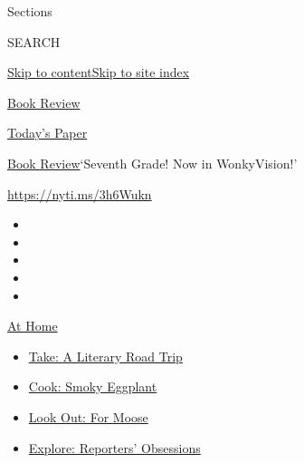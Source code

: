 Sections

SEARCH

\protect\hyperlink{site-content}{Skip to
content}\protect\hyperlink{site-index}{Skip to site index}

\href{https://www.nytimes3xbfgragh.onion/section/books/review}{Book
Review}

\href{https://myaccount.nytimes3xbfgragh.onion/auth/login?response_type=cookie\&client_id=vi}{}

\href{https://www.nytimes3xbfgragh.onion/section/todayspaper}{Today's
Paper}

\href{/section/books/review}{Book Review}\textbar{}`Seventh Grade! Now
in WonkyVision!'

\url{https://nyti.ms/3h6Wukn}

\begin{itemize}
\item
\item
\item
\item
\item
\end{itemize}

\href{https://www.nytimes3xbfgragh.onion/spotlight/at-home?action=click\&pgtype=Article\&state=default\&region=TOP_BANNER\&context=at_home_menu}{At
Home}

\begin{itemize}
\tightlist
\item
  \href{https://www.nytimes3xbfgragh.onion/2020/07/28/books/time-for-a-literary-road-trip.html?action=click\&pgtype=Article\&state=default\&region=TOP_BANNER\&context=at_home_menu}{Take:
  A Literary Road Trip}
\item
  \href{https://www.nytimes3xbfgragh.onion/2020/07/29/magazine/bored-with-your-home-cooking-some-smoky-eggplant-will-fix-that.html?action=click\&pgtype=Article\&state=default\&region=TOP_BANNER\&context=at_home_menu}{Cook:
  Smoky Eggplant}
\item
  \href{https://www.nytimes3xbfgragh.onion/2020/07/27/travel/moose-michigan-isle-royale.html?action=click\&pgtype=Article\&state=default\&region=TOP_BANNER\&context=at_home_menu}{Look
  Out: For Moose}
\item
  \href{https://www.nytimes3xbfgragh.onion/interactive/2020/at-home/even-more-reporters-editors-diaries-lists-recommendations.html?action=click\&pgtype=Article\&state=default\&region=TOP_BANNER\&context=at_home_menu}{Explore:
  Reporters' Obsessions}
\end{itemize}

